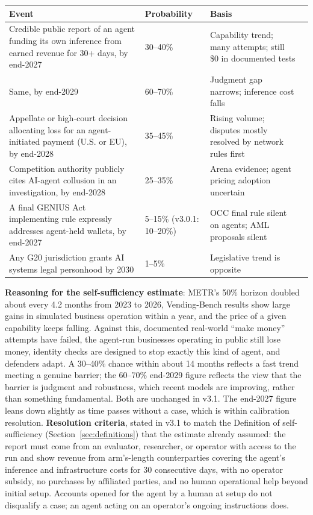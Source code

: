 \documentclass[11pt,letterpaper]{article}
\begin{document}
\begin{center}
\small
\begin{tabularx}{\linewidth}{ZY{1.66}Y{0.46}Y{0.88}}
\toprule
\textbf{Event} & \textbf{Probability} & \textbf{Basis} \\
\midrule
Credible public report of an agent funding its own inference from earned revenue for 30+ days, by end-2027 & 30--40\% & Capability trend; many attempts; still \$0 in documented tests \\
Same, by end-2029 & 60--70\% & Judgment gap narrows; inference cost falls \\
Appellate or high-court decision allocating loss for an agent-initiated payment (U.S. or EU), by end-2028 & 35--45\% & Rising volume; disputes mostly resolved by network rules first \\
Competition authority publicly cites AI-agent collusion in an investigation, by end-2028 & 25--35\% & Arena evidence; agent pricing adoption uncertain \\
A final GENIUS Act implementing rule expressly addresses agent-held wallets, by end-2027 & 5--15\% (v3.0.1: 10--20\%) & OCC final rule silent on agents; AML proposals silent \\
Any G20 jurisdiction grants AI systems legal personhood by 2030 & 1--5\% & Legislative trend is opposite \\
\bottomrule
\end{tabularx}
\end{center}

\textbf{Reasoning for the self-sufficiency estimate}: METR's 50\% horizon doubled about every 4.2 months from 2023 to 2026, Vending-Bench results show large gains in simulated business operation within a year, and the price of a given capability keeps falling. Against this, documented real-world ``make money'' attempts have failed, the agent-run businesses operating in public still lose money, identity checks are designed to stop exactly this kind of agent, and defenders adapt. A 30--40\% chance within about 14 months reflects a fast trend meeting a genuine barrier; the 60--70\% end-2029 figure reflects the view that the barrier is judgment and robustness, which recent models are improving, rather than something fundamental. Both are unchanged in v3.1. The end-2027 figure leans down slightly as time passes without a case, which is within calibration resolution. \textbf{Resolution criteria}, stated in v3.1 to match the Definition of self-sufficiency (Section~\ref{sec:definitions}) that the estimate already assumed: the report must come from an evaluator, researcher, or operator with access to the run and show revenue from arm's-length counterparties covering the agent's inference and infrastructure costs for 30 consecutive days, with no operator subsidy, no purchases by affiliated parties, and no human operational help beyond initial setup. Accounts opened for the agent by a human at setup do not disqualify a case; an agent acting on an operator's ongoing instructions does.
\end{document}
